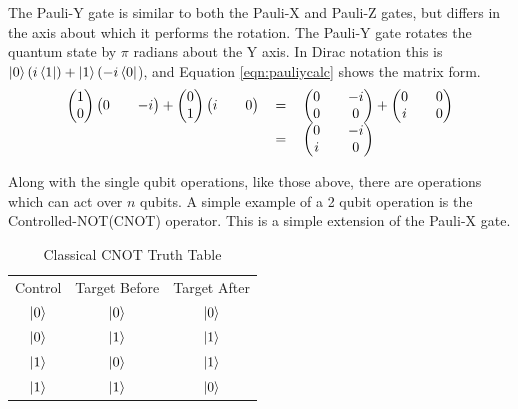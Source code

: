 The Pauli-Y gate is similar to both the Pauli-X and Pauli-Z gates, but differs in the axis about which it performs the rotation.
The Pauli-Y gate rotates the quantum state by $\pi$ radians about the Y axis.
In Dirac notation this is $\left\vert{0}\right\rangle(i\left\langle{1}\right\vert) + \left\vert{1}\right\rangle(-i\left\langle{0}\right\vert$), and Equation \ref{eqn:pauliycalc} shows the matrix form.
\begin{equation}
\label{eqn:pauliycalc}
\begin{tabular}{ r c l }
\(\begin {pmatrix}
1 \\
0
\end{pmatrix}
\begin {pmatrix}
0 &&
-i
\end{pmatrix}
 + 
\begin {pmatrix}
0 \\
1
\end{pmatrix}
\begin {pmatrix}
i &&
0
\end{pmatrix}\)
& \(=\)
& \( 
\begin{pmatrix}
0 && -i \\
0 && 0
\end{pmatrix}
 + 
\begin{pmatrix}
0 && 0\\
i && 0
\end{pmatrix}
\) \\
& \(=\)
& \( 
\begin{pmatrix}
0 && -i \\
i && 0
\end{pmatrix}
\)
\end{tabular}
\end{equation}

Along with the single qubit operations, like those above, there are operations which can act over $n$ qubits.
A simple example of a 2 qubit operation is the Controlled-NOT(CNOT) operator.
This is a simple extension of the Pauli-X gate.

\begin{table}
\centering
\begin{tabular}{ c | c || c | }
Control & Target Before & Target After \\
$\left\vert{0}\right\rangle$ & $\left\vert{0}\right\rangle$ & $\left\vert{0}\right\rangle$ \\
$\left\vert{0}\right\rangle$ & $\left\vert{1}\right\rangle$ & $\left\vert{1}\right\rangle$ \\
$\left\vert{1}\right\rangle$ & $\left\vert{0}\right\rangle$ & $\left\vert{1}\right\rangle$ \\
$\left\vert{1}\right\rangle$ & $\left\vert{1}\right\rangle$ & $\left\vert{0}\right\rangle$ \\
\end{tabular}
\caption{Classical CNOT Truth Table}
\label{CNOTTruthTable}
\end{table}

